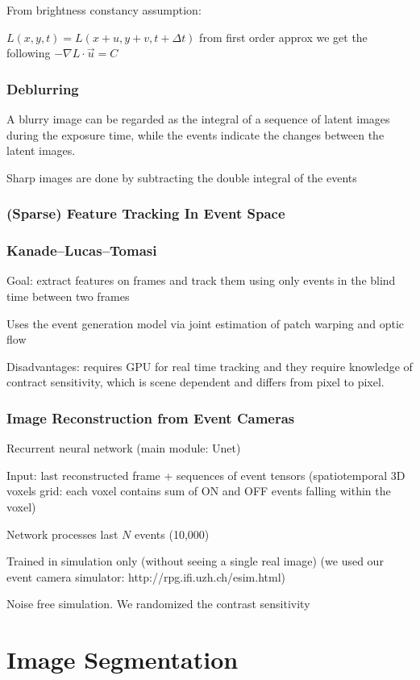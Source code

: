 From brightness constancy assumption:

$L(x,y,t) = L(x+u,y+v,t+\Delta t)$ from first order approx we get the following $-\nabla L \cdot \vec u = C$

\subsubsection{Deblurring}

A blurry image can be regarded as the integral of a sequence of latent images during the exposure time, while the events indicate the changes between the latent images.

Sharp images are done by subtracting the double integral of the events

\subsubsection{(Sparse) Feature Tracking In Event Space}

\subsubsection{Kanade–Lucas–Tomasi}

Goal: extract features on frames and track them using only events in the blind time between two frames

Uses the event generation model via joint estimation of patch warping and optic flow

Disadvantages: requires GPU for real time tracking and they require knowledge of contract sensitivity, which is scene dependent and differs from pixel to pixel.	

\subsubsection{Image Reconstruction from Event Cameras}

Recurrent neural network (main module: Unet) 

Input: last reconstructed frame + sequences of event tensors (spatiotemporal 3D voxels grid: each voxel contains sum of ON and OFF events falling within the voxel)

Network processes last $N$ events (10,000) 

Trained in simulation only (without seeing a single real image) (we used our event camera simulator: http://rpg.ifi.uzh.ch/esim.html) 

Noise free simulation. We randomized the contrast sensitivity


\section{Image Segmentation}

